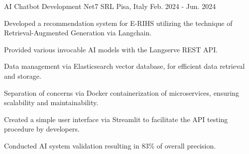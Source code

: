 

\begin{cventries}

  \cventry
  {AI Chatbot Development} %
  {Net7 SRL} %
  {Pisa, Italy} %
  {Feb. 2024 - Jun. 2024} %
  {
    \begin{cvitems} %
      \item {Developed a recommendation system for E-RIHS utilizing the technique of Retrieval-Augmented Generation via Langchain.}
      \item {Provided various invocable AI models with the Langserve REST API.}
      \item {Data management via Elasticsearch vector database, for efficient data retrieval and storage.}
      \item {Separation of concerns via Docker containerization of microservices, ensuring scalability and maintainability.}
      \item {Created a simple user interface via Streamlit to facilitate the API testing procedure by developers.}
      \item {Conducted AI system validation resulting in 83\% of overall precision.}
    \end{cvitems}
  }

\end{cventries}
